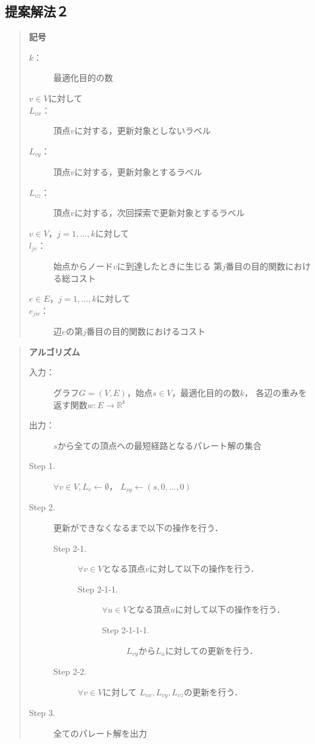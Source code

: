 \documentclass[12pt]{optlab-bachelor}
\begin{document}
\subsection{提案解法２}
\begin{quote}
  \textbf{記号}
  \begin{description}
    \item[$k$：] 最適化目的の数
    \item[$v \in V$に対して]
    \item[$L_{vx}$：] 頂点$v$に対する，更新対象としないラベル
    \item[$L_{vy}$：] 頂点$v$に対する，更新対象とするラベル
    \item[$L_{vz}$：] 頂点$v$に対する，次回探索で更新対象とするラベル
    \item[$v \in V$，$j = 1 , \ldots , k$に対して]
    \item[$l_{jv}$：] 始点からノード$v$に到達したときに生じる
    第$j$番目の目的関数における総コスト
    \item[$e \in E$，$j = 1 , \ldots , k$に対して]
    \item[$e_{jw}$：] 辺$e$の第$j$番目の目的関数におけるコスト
  \end{description}
\end{quote}

\begin{quote}
  \textbf{アルゴリズム}
  \begin{description}
    \item[入力：] グラフ$G=(V,E)$，始点$s \in V$，最適化目的の数$k$，
    各辺の重みを返す関数$w : E \to \mathbb{R}^k$
    \item[出力：] $s$から全ての頂点への最短経路となるパレート解の集合
    \item[Step 1.] $\forall v \in V , L_v \leftarrow \emptyset$，
    $L_{sy} \leftarrow (s,0,\ldots,0)$
    \item[Step 2.] 更新ができなくなるまで以下の操作を行う．
    \begin{description}
      \item[Step 2-1.] $\forall v \in V$となる頂点$v$に対して以下の操作を行う．
      \begin{description}
        \item[Step 2-1-1.] $\forall u \in V$となる頂点$u$に対して以下の操作を行う．
        \begin{description}
          \item[Step 2-1-1-1.] $L_{vy}$から$L_u$に対しての更新を行う．
        \end{description}
      \end{description}
      \item[Step 2-2.] $\forall v \in V$に対して
      $L_{vx},L_{vy},L_{vz}$の更新を行う．
    \end{description}
    \item[Step 3.] 全てのパレート解を出力
  \end{description}
\end{quote}
\end{document}
